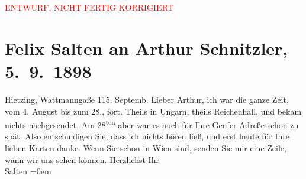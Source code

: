 
\begin{center}
            \textcolor{red}{ENTWURF, NICHT FERTIG KORRIGIERT}
                      \end{center}
            
         \renewcommand{\erwaehnteOrte}{Orte: Bad Reichenhall, Genf, Ungarn, Wattmanngasse, Wien}
         \renewcommand{\erwaehnteWerke}{}
               \section[Felix Salten an Arthur Schnitzler, 5. 9. 1898]{ Felix Salten an Arthur Schnitzler, 5. 9. 1898}\nopagebreak{}\rehead{ }\begin{ledgroupsized}[t]{13cm}\normalsize\beginnumbering \toendnotes[C]{\smallbreak\pagebreak[2]} 
\pstart
           \raggedleft{}{\pb}Hietzing, Wattmanngaße 115. Septemb.\pend
           \pstart
           Lieber Arthur, ich war die ganze Zeit, vom 4. August
               bis zum 28., fort. Theils in Ungarn, theils Reichenhall, und bekam
               nichts nachgesendet. Am 28\textsuperscript{ten} aber war es auch für Ihre Genfer Adreße
               schon zu spät. Also entschuldigen Sie, dass ich nichts hören ließ, und erst heute für
               Ihre lieben Karten danke. Wenn Sie schon in Wien
               sind, senden Sie mir eine Zeile, wann wir uns sehen können.\pend
           \pstart
           Herzlichst Ihr {\\[\baselineskip]}\spacefill\mbox{Salten}\pend
           \leftskip=0em{}
         
         \endnumbering{}\end{ledgroupsized}\begin{anhang}\end{anhang}\newcommand{\dateiname}{L03281}\newcommand{\titel}{Felix Salten an Arthur Schnitzler, 5. 9. 1898}\newcommand{\editorInnen}{Martin Anton Müller und Laura Untner}
      